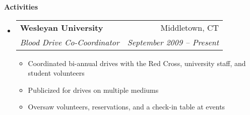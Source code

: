 \documentclass[letterpaper,11pt]{article}
\makeatletter
\newcommand{\resitem}[1]{\item #1 \vspace{-2pt}}
\newcommand{\resheading}[1]{{\large \colorbox{mygrey}{\begin{minipage}{\textwidth}{\textbf{#1 \vphantom{p\^{E}}}}\end{minipage}}}}
\newcommand{\ressubheading}[4]{
\begin{tabular*}{7in}{l@{\extracolsep{\fill}}r} 
		\textbf{#1} & #2 \\
		\textit{#3} & \textit{#4} \\
\end{tabular*}\vspace{-2pt}}
\makeatother
\begin{document}
\resheading{Activities}
   \begin{itemize}

       \item
	\ressubheading{Wesleyan University}{Middletown, CT}{Blood Drive Co-Coordinator}{September 2009 -- Present}
	{\footnotesize	\begin{itemize}
	    \resitem{Coordinated bi-annual drives with the Red Cross, university staff, and student volunteers}
	    \resitem{Publicized for drives on multiple mediums}
	    \resitem{Oversaw volunteers, reservations, and a check-in table at events}
	\end{itemize}	}


\end{itemize} %
\end{document}
